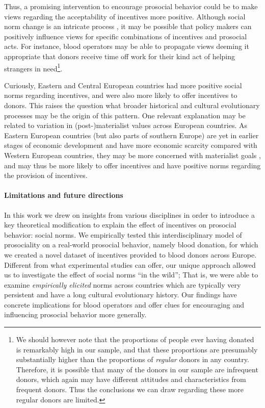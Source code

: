 \documentclass[AER]{AEA}
\begin{document}
Thus, a promising intervention to encourage prosocial behavior could be to make views regarding the acceptability of incentives more positive. Although social norm change is an intricate process \citep{cialdini_social_1998}, it may be possible that policy makers can positively influence views for specific combinations of incentives and prosocial acts. For instance, blood operators may be able to propagate views deeming it appropriate that donors receive time off work for their kind act of helping strangers in need\footnote{We should however note that the proportions of people ever having donated is remarkably high in our sample, and that these proportions are presumably substantially higher than the proportions of \textit{regular} donors in any country. Therefore, it is possible that many of the donors in our sample are infrequent donors, which again may have different attitudes and characteristics from frequent donors. Thus the conclusions we can draw regarding these more regular donors are limited.}.

Curiously, Eastern and Central European countries had more positive social norms regarding incentives, and were also more likely to offer incentives to donors. This raises the question what broader historical and cultural evolutionary processes may be the origin of this pattern. One relevant explanation may be related to variation in (post-)materialist values across European countries. As Eastern European countries (but also parts of southern Europe) are yet in earlier stages of economic development and have more economic scarcity compared with Western European countries, they may be more concerned with materialist goals \citep{inglehart_globalization_2000, inglehart_economic_1994}, and may thus be more likely to offer incentives and have positive norms regarding the provision of incentives.

\paragraph{Limitations and future directions}

In this work we drew on insights from various disciplines in order to introduce a key theoretical modification to explain the effect of incentives on prosocial behavior: social norms. We empirically tested this interdisciplinary model of prosociality on a real-world prosocial behavior, namely blood donation, for which we created a novel dataset of incentives provided to blood donors across Europe. Different from what experimental studies can offer, our unique approach allowed us to investigate the effect of social norms “in the wild”; That is, we were able to examine \textit{empirically elicited} norms across countries which are typically very persistent and have a long cultural evolutionary history. Our findings have concrete implications for blood operators and offer clues for encouraging and influencing prosocial behavior more generally.
\end{document}
